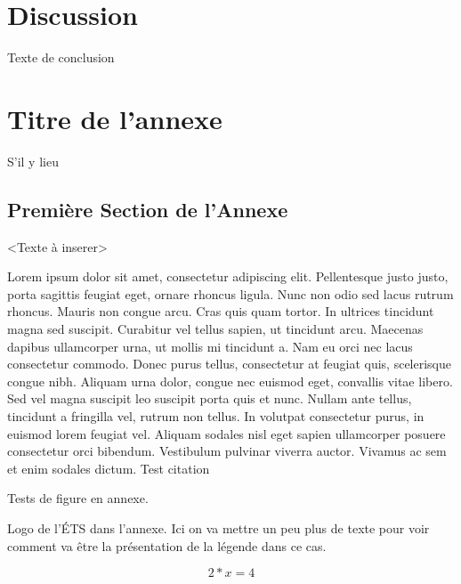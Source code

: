 \documentclass[letterpaper, twoside, 12pt, memoire, creativecommons, hyperref]{thETS}
\begin{document}
\chapter{Discussion}

\begin{conclusion}
Texte de conclusion

\end{conclusion}


\appendix


\multiannexe %
%
\chapter{Titre de l'annexe} 

S'il y lieu

\section{Première Section de l'Annexe}
<Texte à inserer> 

Lorem ipsum dolor sit amet, consectetur adipiscing elit. Pellentesque justo justo, porta sagittis feugiat eget, ornare rhoncus ligula. Nunc non odio sed lacus rutrum rhoncus. Mauris non congue arcu. Cras quis quam tortor. In ultrices tincidunt magna sed suscipit. Curabitur vel tellus sapien, ut tincidunt arcu. Maecenas dapibus ullamcorper urna, ut mollis mi tincidunt a. Nam eu orci nec lacus consectetur commodo. Donec purus tellus, consectetur at feugiat quis, scelerisque congue nibh. Aliquam urna dolor, congue nec euismod eget, convallis vitae libero. Sed vel magna suscipit leo suscipit porta quis et nunc. Nullam ante tellus, tincidunt a fringilla vel, rutrum non tellus. In volutpat consectetur purus, in euismod lorem feugiat vel. Aliquam sodales nisl eget sapien ullamcorper posuere consectetur orci bibendum. Vestibulum pulvinar viverra auctor. Vivamus ac sem et enim sodales dictum. Test citation \cite{Bha10}

Tests de figure en annexe.

%

\begin{figureap}[ht]
	\caption{Logo de l'ÉTS dans l'annexe. Ici on va mettre un peu plus de texte pour voir comment va être la présentation de
	la légende dans ce cas.}
	\label{fig:testap}
\end{figureap}
\begin{center}
\begin{equation} 
2*x=4 
\end{equation}
\end{center}
\end{document}
